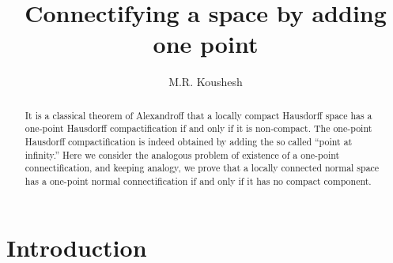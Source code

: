 \documentclass{amsart}
\newenvironment{proof of claim}{\noindent\textbf{Proof of the claim.}}{\hfill{$\square$}\newline}
\theoremstyle{definition}
\theoremstyle{remark}
\numberwithin{equation}{section}
\begin{document}

\title[Connectifying a space by adding one point]{Connectifying a space by adding one point}

\author{M.R. Koushesh}

\address{Department of Mathematical Sciences, Isfahan University of Technology, Isfahan 84156--83111, Iran and School of Mathematics, Institute for Research in Fundamental Sciences (IPM), P.O. Box: 19395--5746, Tehran, Iran.}






\begin{abstract}
It is a classical theorem of Alexandroff that a locally compact Hausdorff space has a one-point Hausdorff compactification if and only if it is non-compact. The one-point Hausdorff compactification is indeed obtained by adding the so called ``point at infinity.'' Here we consider the analogous problem of existence of a one-point connectification, and keeping analogy, we prove that a locally connected normal space has a one-point normal connectification if and only if it has no compact component.
\end{abstract}

\maketitle


\section{Introduction}
\end{document}
